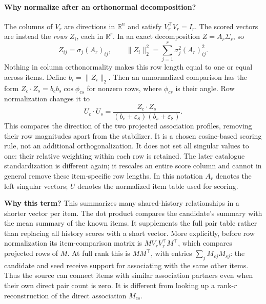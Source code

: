 \documentclass[11pt,a4paper]{article}
\newcommand{\why}{\par\textbf{Why this term?} }
\numberwithin{equation}{section}
\begin{document}
\paragraph{Why normalize after an orthonormal decomposition?}
The columns of $V_r$ are directions in $\mathbb R^n$ and satisfy
$V_r^\top V_r=I_r$. The scored vectors are instead the \emph{rows} $Z_i$,
each in $\mathbb R^r$. In an exact decomposition $Z=A_r\Sigma_r$, so
\begin{equation}
 Z_{ij}=\sigma_j(A_r)_{ij},\qquad
 \lVert Z_i\rVert_2^2=\sum_{j=1}^r\sigma_j^2(A_r)_{ij}^2.
\end{equation}
Nothing in column orthonormality makes this row length equal to one or equal
across items. Define $b_i=\lVert Z_i\rVert_2$. Then an unnormalized comparison
has the form $Z_c\cdot Z_s=b_cb_s\cos\phi_{cs}$ for nonzero rows, where
$\phi_{cs}$ is their angle. Row normalization changes it to
\begin{equation}
 U_c\cdot U_s=
 \frac{Z_c\cdot Z_s}{(b_c+\varepsilon_8)(b_s+\varepsilon_8)}.
\end{equation}
This compares the direction of the two projected association profiles, removing
their row magnitudes apart from the stabilizer. It is a chosen cosine-based
scoring rule, not an additional orthogonalization. It does not set all singular
values to one: their relative weighting within each row is retained. The later
catalogue standardization is different again; it rescales an entire score column
and cannot in general remove these item-specific row lengths. In this notation
$A_r$ denotes the left singular vectors; $U$ denotes the normalized item table
used for scoring.
\why This summarizes many shared-history relationships in a shorter vector per item.
The dot product compares the candidate's summary with the mean summary of the known items.
It supplements the full pair table rather than replacing all history scores with a short vector.
More explicitly, before row normalization its item-comparison matrix is
$MV_rV_r^\top M^\top$, which compares projected rows of $M$.
At full rank this is $MM^\top$, with entries $\sum_jM_{cj}M_{sj}$: the candidate
and seed receive support for associating with the same other items. Thus the
source can connect items with similar association partners even when their own
direct pair count is zero. It is different from looking up a rank-$r$
reconstruction of the direct association $M_{cs}$.
\end{document}
